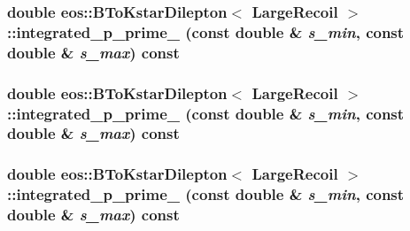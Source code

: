 \label{classeos_1_1BToKstarDilepton_3_01LargeRecoil_01_4_ac451e0cec0a12b23c33d21f9961d77d4}
\hypertarget{classeos_1_1BToKstarDilepton_3_01LargeRecoil_01_4_a9c42a3d8488509596ae4292000e03010}{
\subsubsection[{integrated\_\-p\_\-prime\_\-4}]{\setlength{\rightskip}{0pt plus 5cm}double eos::BToKstarDilepton$<$ {\bf LargeRecoil} $>$::integrated\_\-p\_\-prime\_ (const double \& {\em s\_\-min}, \/  const double \& {\em s\_\-max}) const}}
\label{classeos_1_1BToKstarDilepton_3_01LargeRecoil_01_4_a9c42a3d8488509596ae4292000e03010}
\hypertarget{classeos_1_1BToKstarDilepton_3_01LargeRecoil_01_4_a53a468080844fbd3966da39a70018d5f}{
\subsubsection[{integrated\_\-p\_\-prime\_\-5}]{\setlength{\rightskip}{0pt plus 5cm}double eos::BToKstarDilepton$<$ {\bf LargeRecoil} $>$::integrated\_\-p\_\-prime\_ (const double \& {\em s\_\-min}, \/  const double \& {\em s\_\-max}) const}}
\label{classeos_1_1BToKstarDilepton_3_01LargeRecoil_01_4_a53a468080844fbd3966da39a70018d5f}
\hypertarget{classeos_1_1BToKstarDilepton_3_01LargeRecoil_01_4_a4c040333bb5e90385f38c6990cf7dacc}{
\subsubsection[{integrated\_\-p\_\-prime\_\-6}]{\setlength{\rightskip}{0pt plus 5cm}double eos::BToKstarDilepton$<$ {\bf LargeRecoil} $>$::integrated\_\-p\_\-prime\_ (const double \& {\em s\_\-min}, \/  const double \& {\em s\_\-max}) const}}
